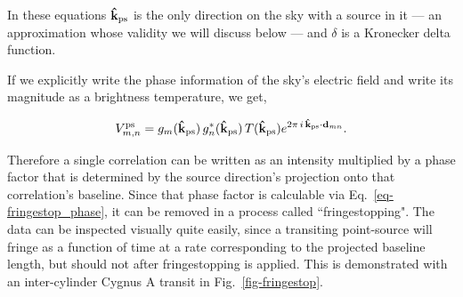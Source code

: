 \noindent In these equations $\mathbf{\hat{k}}_{\rm ps}$ is the only direction 
on the sky with a source in it --- an approximation whose validity we 
will discuss below --- and $\delta$ is a Kronecker delta function. 

If we explicitly write the phase information of the sky's 
electric field and write its magnitude as a brightness 
temperature, we get,

\begin{equation}
\label{eqn-tsky}
V^{\rm ps}_{m,n} = {g}_m(\mathbf{\hat{k}}_{\rm ps}) \, 
g^*_n(\mathbf{\hat{k}}_{\rm ps})\, T(\mathbf{\hat{k}_{\rm ps}}) 
e^{2\pi \,i \,\mathbf{\hat{k}_{\rm ps}} \cdot \mathbf{d}_{mn}}.
\end{equation}

Therefore a single correlation can be written as an intensity multiplied 
by a phase factor that is determined by the source direction's
projection onto that correlation's baseline. Since that phase 
factor is calculable via Eq.~\ref{eq-fringestop_phase}, it 
can be removed in a process called ``fringestopping". The 
data can be inspected visually quite easily, since 
a transiting point-source will fringe as a function of 
time at a rate corresponding 
to the projected baseline length, but should not after fringestopping 
is applied. This is demonstrated with an inter-cylinder Cygnus A transit in 
Fig.~\ref{fig-fringestop}. 



